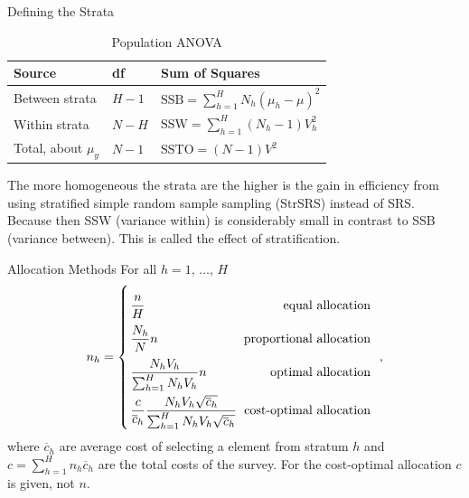 \documentclass[10pt]{beamer}\usepackage[]{graphicx}\usepackage[]{color}
\newcommand{\V}[1]{\text{V}\left(#1\right)}
\begin{document}
\begin{frame}{Defining the Strata}
  \begin{table}\caption{Population ANOVA}
  \begin{tabular}{l | l | l }
  Source & df & Sum of Squares  \\
  \hline 
   Between strata         & $H-1$ & $\text{SSB}  = \sum_{h=1}^H N_h ( \mu_{h} - \mu  )^2$  \\ 
   Within  strata         & $N-H$ & $\text{SSW}  = \sum_{h=1}^H (N_h-1) V_{h}^2$  \\
   Total,  about  $\mu_y$ & $N-1$ & $\text{SSTO} = (N-1) V^2$ \\
  \end{tabular}
  \end{table}

The more homogeneous the strata are the higher is the gain in efficiency from using stratified simple random sample sampling (StrSRS) instead of SRS. Because then SSW (variance within) is
considerably small in contrast to SSB (variance between). This is called
the  effect of stratification. 

\end{frame}


\begin{frame}{Allocation Methods}
For all $h = 1{,}\,\ldots{,}\,H$
 \begin{equation*} \arraycolsep=1.4pt\def\arraystretch{2.2}
  n_h = \left\{ \begin{array}{l r}
        \dfrac{n}{H}  &\; \text{equal allocation} \\
        \dfrac{N_h}{N}  n    &\; \text{proportional allocation} \\
        \dfrac{N_h V_{h}}{\sum_{h=1}^H N_h V_{h} }  n  &\; \text{optimal allocation} \\
        \dfrac{c}{\overline{c}_h} \dfrac{N_h V_{h} \sqrt{\overline{c}_h} }{\sum_{h=1}^H N_h V_{h} \sqrt{\overline{c}_h}}    &\;  \text{cost-optimal allocation}
  \end{array}\;\right.{,}
 \end{equation*}
 where $\overline{c}_h$ are average cost of selecting a element from stratum $h$ and $c=\sum_{h=1}^H n_h \overline{c}_h$ are the total costs of the survey. For the cost-optimal allocation $c$ is given, not $n$.
% 
\end{frame}
\end{document}
